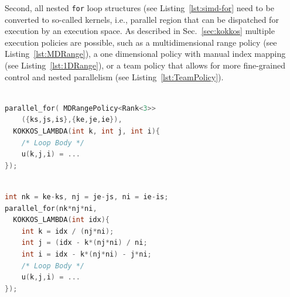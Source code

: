 \documentclass[10pt,journal,compsoc]{IEEEtran}
\newcommand{\textcode}[1]{\textsc{#1}}
\newcommand{\kokkos}{\textcode{Kokkos}\xspace}
\begin{document}
Second, all nested \texttt{for} loop structures (see Listing~\ref{lst:simd-for}
need to be converted to so-called kernels, i.e., parallel region that can be dispatched
for execution by an execution space.
As described in Sec.~\ref{sec:kokkos} multiple execution policies are possible,
such as a multidimensional range policy (see Listing~\ref{lst:MDRange}),
a one dimensional policy with manual index mapping (see Listing~\ref{lst:1DRange}),
or a team policy
that allows for more fine-grained control and nested parallelism 
(see Listing~\ref{lst:TeamPolicy}).

\begin{lstlisting}[language=C++,label=lst:MDRange,caption={
Example \lstinline!for! loop using \kokkos. The loop body is
reformulated into a lambda function and passed into
\lstinline!Kokkos::parallel_for!  to execute on the target architecture.
The class \lstinline!Kokkos::MDRangePolicy! specifies the loop bounds.
The  array \lstinline!u! is now a \lstinline!Kokkos::View!, a
\kokkos building block that allows transparent access to CPU and GPU memory.
The loop body, i.e., the majority of the code, remains mostly unchanged.
}]

parallel_for( MDRangePolicy<Rank<3>> 
    ({ks,js,is},{ke,je,ie}),
  KOKKOS_LAMBDA(int k, int j, int i){
    /* Loop Body */
    u(k,j,i) = ...
});
\end{lstlisting} 

\begin{lstlisting}[language=C++,label=lst:1DRange,caption={
Same as Listing~\ref{lst:MDRange} but using a one dimensional
\lstinline!Kokkos::RangePolicy! (implicit through default template
parameter) with explicit index calculation.
}]

int nk = ke-ks, nj = je-js, ni = ie-is;
parallel_for(nk*nj*ni, 
  KOKKOS_LAMBDA(int idx){
    int k = idx / (nj*ni);
    int j = (idx - k*(nj*ni) / ni;
    int i = idx - k*(nj*ni) - j*ni;
    /* Loop Body */
    u(k,j,i) = ...
});
\end{lstlisting} 
\end{document}
